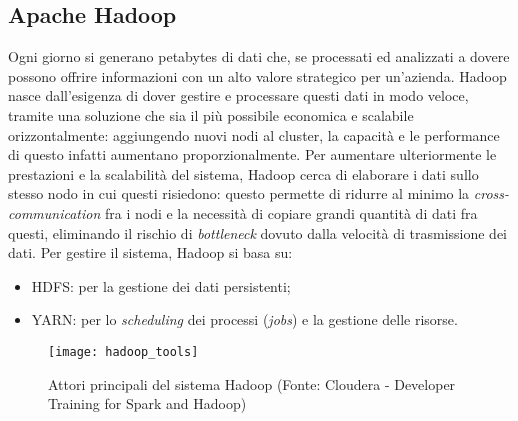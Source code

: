 \subsection{Apache Hadoop}
Ogni giorno si generano petabytes di dati che, se processati ed analizzati a dovere possono offrire informazioni con un alto valore strategico per un'azienda. Hadoop nasce dall'esigenza di dover gestire e processare questi dati in modo veloce, tramite una soluzione che sia il più possibile economica e scalabile orizzontalmente: aggiungendo nuovi nodi al cluster, la capacità e le performance di questo infatti aumentano proporzionalmente. Per aumentare ulteriormente le prestazioni e la scalabilità del sistema, Hadoop cerca di elaborare i dati sullo stesso nodo in cui questi risiedono: questo permette di ridurre al minimo la \textit{cross-communication} fra i nodi e la necessità di copiare grandi quantità di dati fra questi, eliminando il rischio di \textit{bottleneck} dovuto dalla velocità di trasmissione dei dati. Per gestire il sistema, Hadoop si basa su:
\begin{itemize}
	\item \gls{HDFS}: per la gestione dei dati persistenti;
	\item YARN: per lo \textit{scheduling} dei processi (\textit{jobs}) e la gestione delle risorse.
\end{itemize}
\begin{figure}[!h]
	\centering 
	\texttt{[image: hadoop\_tools]}
	\caption{Attori principali del sistema Hadoop (Fonte: Cloudera - Developer Training for Spark and Hadoop)}
\end{figure}
